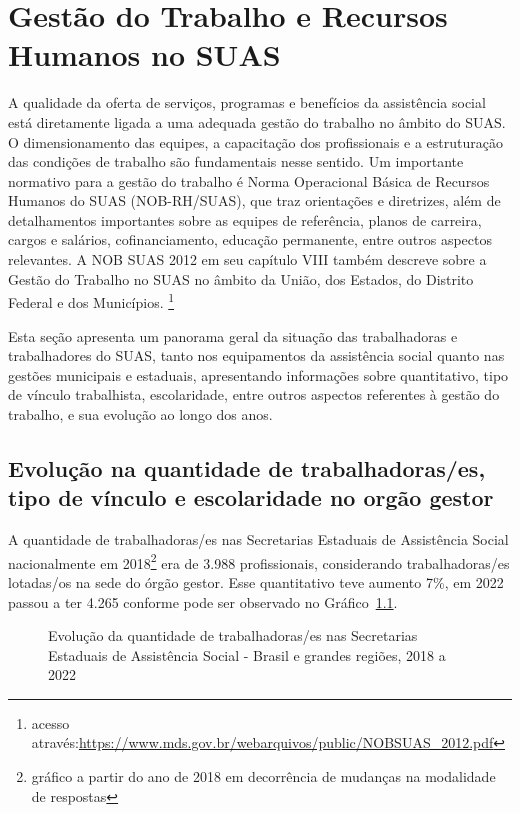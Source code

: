 \documentclass[
  letterpaper,
  DIV=11,
  numbers=noendperiod]{scrreprt}
\begin{document}

\chapter{Gestão do Trabalho e Recursos Humanos no
SUAS}\label{gestuxe3o-do-trabalho-e-recursos-humanos-no-suas}

A qualidade da oferta de serviços, programas e benefícios da assistência
social está diretamente ligada a uma adequada gestão do trabalho no
âmbito do SUAS. O dimensionamento das equipes, a capacitação dos
profissionais e a estruturação das condições de trabalho são
fundamentais nesse sentido. Um importante normativo para a gestão do
trabalho é Norma Operacional Básica de Recursos Humanos do SUAS
(NOB-RH/SUAS), que traz orientações e diretrizes, além de detalhamentos
importantes sobre as equipes de referência, planos de carreira, cargos e
salários, cofinanciamento, educação permanente, entre outros aspectos
relevantes. A NOB SUAS 2012 em seu capítulo VIII também descreve sobre a
Gestão do Trabalho no SUAS no âmbito da União, dos Estados, do Distrito
Federal e dos Municípios. \footnote{acesso
  através:\url{https://www.mds.gov.br/webarquivos/public/NOBSUAS_2012.pdf}}

Esta seção apresenta um panorama geral da situação das trabalhadoras e
trabalhadores do SUAS, tanto nos equipamentos da assistência social
quanto nas gestões municipais e estaduais, apresentando informações
sobre quantitativo, tipo de vínculo trabalhista, escolaridade, entre
outros aspectos referentes à gestão do trabalho, e sua evolução ao longo
dos anos.

\section{Evolução na quantidade de trabalhadoras/es, tipo de vínculo e
escolaridade no orgão
gestor}\label{evoluuxe7uxe3o-na-quantidade-de-trabalhadorases-tipo-de-vuxednculo-e-escolaridade-no-orguxe3o-gestor}

A quantidade de trabalhadoras/es nas Secretarias Estaduais de
Assistência Social nacionalmente em 2018\footnote{gráfico a partir do
  ano de 2018 em decorrência de mudanças na modalidade de respostas} era
de 3.988 profissionais, considerando trabalhadoras/es lotadas/os na sede
do órgão gestor. Esse quantitativo teve aumento 7\%, em 2022 passou a
ter 4.265 conforme pode ser observado no Gráfico~\ref{fig-qtd-trab-uf}.

\begin{figure}


\caption{\label{fig-qtd-trab-uf}Evolução da quantidade de
trabalhadoras/es nas Secretarias Estaduais de Assistência Social -
Brasil e grandes regiões, 2018 a 2022}

\end{figure}%
\end{document}

